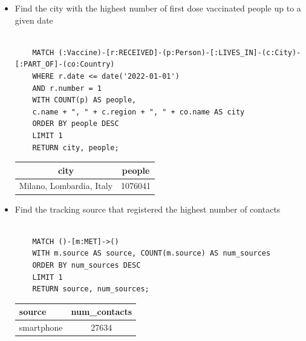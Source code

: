 \documentclass{article}[IEEEtran]
\begin{document}
\begin{itemize}
    \newpage
        
    \item Find the city with the highest number of first dose vaccinated people up to a given date
    
    \begin{lstlisting}
    
    MATCH (:Vaccine)-[r:RECEIVED]-(p:Person)-[:LIVES_IN]-(c:City)-[:PART_OF]-(co:Country)
    WHERE r.date <= date('2022-01-01') 
    AND r.number = 1
    WITH COUNT(p) AS people, 
    c.name + ", " + c.region + ", " + co.name AS city
    ORDER BY people DESC
    LIMIT 1
    RETURN city, people;

    \end{lstlisting}
    
    \vspace{-1cm}
    
    \begin{table}[h]
    \hspace{1.48cm}
    \begin{tabular}{|c|c|}
    \hline
    \textbf{city}            & \textbf{people} \\ \hline
    Milano, Lombardia, Italy & 1076041         \\ \hline
    \end{tabular}%
    \end{table}
    
    \item Find the tracking source that registered the highest number of contacts
    
    \begin{lstlisting}
    
    MATCH ()-[m:MET]->()
    WITH m.source AS source, COUNT(m.source) AS num_sources
    ORDER BY num_sources DESC
    LIMIT 1
    RETURN source, num_sources;

    \end{lstlisting}
    
    \vspace{-1cm}
    
    \begin{table}[H]
    \hspace{1.48cm}
    \begin{tabular}{|l|l|}
    \hline
    \textbf{source} & \textbf{num\_contacts} \\ \hline
    \multicolumn{1}{|c|}{smartphone}      & \multicolumn{1}{|c|}{27634} \\ \hline
    \end{tabular}
    \end{table}
    

\end{itemize}
\end{document}
